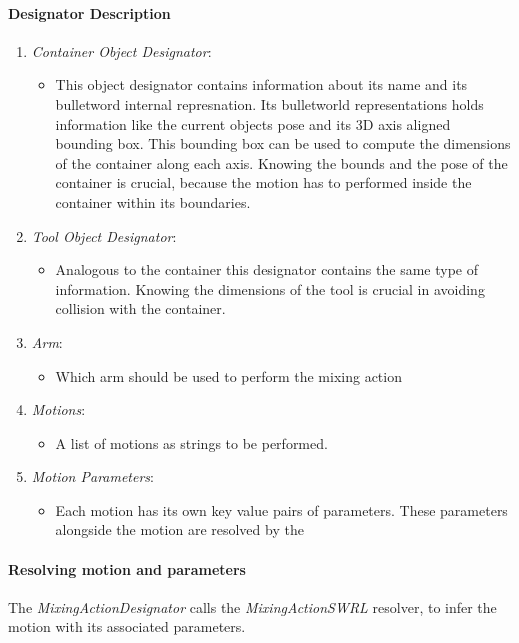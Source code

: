 \paragraph{Designator Description}
\begin{enumerate}
    \item \textit{Container Object Designator}:
    \begin{itemize}
        \item This object designator contains information about its name and its bulletword internal represnation.
            Its bulletworld representations holds information like the current objects pose and its 3D axis aligned bounding box.
            This bounding box can be used to compute the dimensions of the container along each axis. 
            Knowing the bounds and the pose of the container is crucial, because the motion has to performed inside 
            the container within its boundaries.
    \end{itemize}
    \item \textit{Tool Object Designator}:
    \begin{itemize}
        \item Analogous to the container this designator contains the same type of information.
        Knowing the dimensions of the tool is crucial in avoiding collision with the container.
    \end{itemize}
    \item \textit{Arm}:
    \begin{itemize}
        \item Which arm should be used to perform the mixing action
    \end{itemize}
    \item \textit{Motions}:
    \begin{itemize}
        \item A list of motions as strings to be performed. 
    \end{itemize}
    \item \textit{Motion Parameters}:
    \begin{itemize}
        \item Each motion has its own key value pairs of parameters.
        These parameters alongside the motion are resolved by the 
    \end{itemize}
\end{enumerate}

\paragraph*{Resolving motion and parameters}
The \textit{MixingActionDesignator} calls the \textit{MixingActionSWRL} resolver, to infer the motion with its 
associated parameters. 

